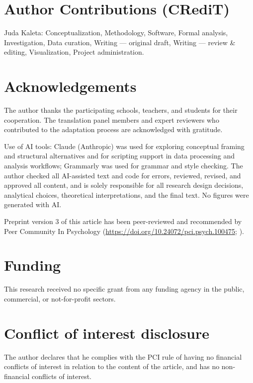 \documentclass[PCJ,Unicode,screen,mode=plain]{cedram}
\begin{document}
\section*{Author Contributions (CRediT)}\label{author-contributions-credit}

Juda Kaleta: Conceptualization, Methodology, Software, Formal analysis, Investigation, Data curation, Writing --- original draft, Writing --- review \& editing, Visualization, Project administration.

\section*{Acknowledgements}\label{acknowledgements}

The author thanks the participating schools, teachers, and students for their cooperation. The translation panel members and expert reviewers who contributed to the adaptation process are acknowledged with gratitude.

Use of AI tools: Claude (Anthropic) was used for exploring conceptual framing and structural alternatives and for scripting support in data processing and analysis workflows; Grammarly was used for grammar and style checking. The author checked all AI-assisted text and code for errors, reviewed, revised, and approved all content, and is solely responsible for all research design decisions, analytical choices, theoretical interpretations, and the final text. No figures were generated with AI.

Preprint version 3 of this article has been peer-reviewed and recommended by Peer Community In Psychology (\url{https://doi.org/10.24072/pci.psych.100475}; \citealp{Hopwood2026Recommendation}).

\section*{Funding}\label{funding}

This research received no specific grant from any funding agency in the public, commercial, or not-for-profit sectors.

\section*{Conflict of interest disclosure}\label{conflict-of-interest-disclosure}

The author declares that he complies with the PCI rule of having no financial conflicts of interest in relation to the content of the article, and has no non-financial conflicts of interest.
\end{document}
